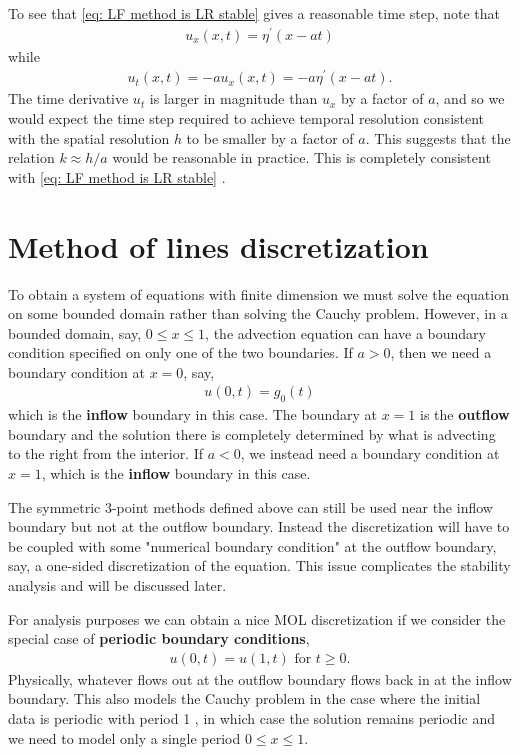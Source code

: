 To see that \eqref{eq: LF method is LR stable}  gives a reasonable time step, note that
\begin{align*}
u_x(x, t)=\eta^{\prime}(x-a t)
\end{align*}
while
\begin{align*}
u_t(x, t)=-a u_x(x, t)=-a \eta^{\prime}(x-a t) .
\end{align*}
The time derivative $u_t$ is larger in magnitude than $u_x$ by a factor of $a$, and so we would expect the time step required to achieve temporal resolution consistent with the spatial resolution $h$ to be smaller by a factor of $a$. This suggests that the relation $k \approx h / a$ would be reasonable in practice. This is completely consistent with \eqref{eq: LF method is LR stable} .

\section{Method of lines discretization} 
 
To obtain a system of equations with finite dimension we must solve the equation on some bounded domain rather than solving the Cauchy problem. However, in a bounded domain, say, $0 \leq x \leq 1$, the advection equation can have a boundary condition specified on only one of the two boundaries. If $a>0$, then we need a boundary condition at $x=0$, say,
\begin{align}
    \label{eq: Advect equation bd}
u(0, t)=g_0(t)
\end{align}
which is the \textbf{inflow} boundary in this case. The boundary at $x=1$ is the \textbf{outflow} boundary and the solution there is completely determined by what is advecting to the right from the interior. If $a<0$, we instead need a boundary condition at $x=1$, which is the \textbf{inflow} boundary in this case.

The symmetric 3-point methods defined above can still be used near the inflow boundary but not at the outflow boundary. Instead the discretization will have to be coupled with some "numerical boundary condition" at the outflow boundary, say, a one-sided discretization of the equation. This issue complicates the stability analysis and will be discussed later.

For analysis purposes we can obtain a nice MOL discretization if we consider the special case of \textbf{periodic boundary conditions},
\begin{align*}
u(0, t)=u(1, t) \text { for } t \geq 0 .
\end{align*}
Physically, whatever flows out at the outflow boundary flows back in at the inflow boundary. This also models the Cauchy problem in the case where the initial data is periodic with period 1 , in which case the solution remains periodic and we need to model only a single period $0 \leq x \leq 1$.

